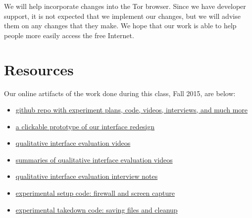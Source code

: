 \documentclass{template}
\begin{document}
 We will help incorporate changes into the Tor browser. Since we have developer support, it is not expected that we implement our changes, but we will advise them on any changes that they make. We hope that our work is able to help people more easily access the free Internet. 

\section{Resources}
\noindent Our online artifacts of the work done during this class, Fall 2015,
are below: 
\begin{itemize} \itemsep1pt \parskip0pt 
\item \href{https://github.com/lindanlee/circumvention-ux-tor}{github repo with experiment plans, code, videos, interviews, and much more}
\item \href{https://marvelapp.com/15a2294}{a clickable prototype of our interface redesign}
\item \href{https://github.com/lindanlee/circumvention-ux-tor/tree/master/sessions/pre/videos}{qualitative interface evaluation videos}
\item \href{https://github.com/lindanlee/circumvention-ux-tor/blob/master/sessions/pre/participant-summaries.txt}{summaries of qualitative interface evaluation videos}
\item \href{https://github.com/lindanlee/circumvention-ux-tor/tree/master/sessions/pre/notes}{qualitative interface evaluation interview notes}
\item \href{https://github.com/lindanlee/circumvention-ux-tor/blob/master/setup/setup-environment}{experimental setup code: firewall and screen capture} 
\item \href{https://github.com/lindanlee/circumvention-ux-tor/blob/master/setup/takedown-environment}{experimental takedown code: saving files and cleanup} 
\end{itemize}

\end{document}

